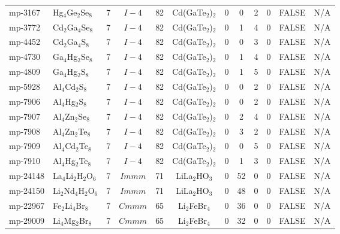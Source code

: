 {\begin{longtable}{llcccccccccc}
    mp-3167 & Hg$_{4}$Ge$_{2}$Se$_{8}$ & 7     & $I-4$ & 82    & Cd(GaTe$_{2}$)$_{2}$ & 0     & 0     & 2     & 0     & FALSE & N/A \\
    mp-3772 & Cd$_{2}$Ga$_{4}$Se$_{8}$ & 7     & $I-4$ & 82    & Cd(GaTe$_{2}$)$_{2}$ & 0     & 1     & 4     & 0     & FALSE & N/A \\
    mp-4452 & Cd$_{2}$Ga$_{4}$S$_{8}$ & 7     & $I-4$ & 82    & Cd(GaTe$_{2}$)$_{2}$ & 0     & 0     & 3     & 0     & FALSE & N/A \\
    mp-4730 & Ga$_{4}$Hg$_{2}$Se$_{8}$ & 7     & $I-4$ & 82    & Cd(GaTe$_{2}$)$_{2}$ & 0     & 1     & 4     & 0     & FALSE & N/A \\
    mp-4809 & Ga$_{4}$Hg$_{2}$S$_{8}$ & 7     & $I-4$ & 82    & Cd(GaTe$_{2}$)$_{2}$ & 0     & 1     & 5     & 0     & FALSE & N/A \\
    mp-5928 & Al$_{4}$Cd$_{2}$S$_{8}$ & 7     & $I-4$ & 82    & Cd(GaTe$_{2}$)$_{2}$ & 0     & 0     & 2     & 0     & FALSE & N/A \\
    mp-7906 & Al$_{4}$Hg$_{2}$S$_{8}$ & 7     & $I-4$ & 82    & Cd(GaTe$_{2}$)$_{2}$ & 0     & 0     & 2     & 0     & FALSE & N/A \\
    mp-7907 & Al$_{4}$Zn$_{2}$Se$_{8}$ & 7     & $I-4$ & 82    & Cd(GaTe$_{2}$)$_{2}$ & 0     & 2     & 4     & 0     & FALSE & N/A \\
    mp-7908 & Al$_{4}$Zn$_{2}$Te$_{8}$ & 7     & $I-4$ & 82    & Cd(GaTe$_{2}$)$_{2}$ & 0     & 3     & 2     & 0     & FALSE & N/A \\
    mp-7909 & Al$_{4}$Cd$_{2}$Te$_{8}$ & 7     & $I-4$ & 82    & Cd(GaTe$_{2}$)$_{2}$ & 0     & 0     & 5     & 0     & FALSE & N/A \\
    mp-7910 & Al$_{4}$Hg$_{2}$Te$_{8}$ & 7     & $I-4$ & 82    & Cd(GaTe$_{2}$)$_{2}$ & 0     & 1     & 3     & 0     & FALSE & N/A \\
    mp-24148 & La$_{4}$Li$_{2}$H$_{2}$O$_{6}$ & 7     & $Immm$ & 71    & LiLa$_{2}$HO$_{3}$ & 0     & 52    & 0     & 0     & FALSE & N/A \\
    mp-24150 & Li$_{2}$Nd$_{4}$H$_{2}$O$_{6}$ & 7     & $Immm$ & 71    & LiLa$_{2}$HO$_{3}$ & 0     & 48    & 0     & 0     & FALSE & N/A \\
    mp-22967 & Fe$_{2}$Li$_{4}$Br$_{8}$ & 7     & $Cmmm$ & 65    & Li$_{2}$FeBr$_{4}$ & 0     & 36    & 0     & 0     & FALSE & N/A \\
    mp-29009 & Li$_{4}$Mg$_{2}$Br$_{8}$ & 7     & $Cmmm$ & 65    & Li$_{2}$FeBr$_{4}$ & 0     & 32    & 0     & 0     & FALSE & N/A \\

\end{longtable}}

